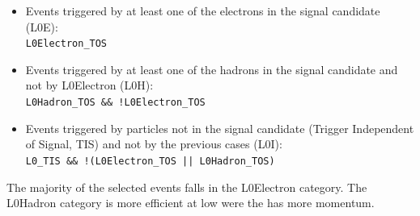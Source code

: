 \begin{itemize}
\item Events triggered by at least one of the electrons in the signal candidate (L0E): \\
{\centering \verb!L0Electron_TOS! }
\item Events triggered by at least one of the hadrons in the signal candidate and not by L0Electron (L0H): \\
{\centering \verb|L0Hadron_TOS && !L0Electron_TOS| }
\item Events triggered by particles not in the signal candidate (Trigger Independent of Signal, TIS) and not by the previous cases (L0I): \\
{\centering \verb|L0_TIS && !(L0Electron_TOS |\verb!|| L0Hadron_TOS)! }
\end{itemize}

The majority of the selected events falls in the L0Electron category.
The L0Hadron category is more efficient at low \qsq were the \Kstarz has more momentum.

